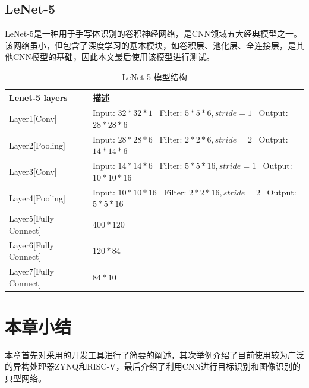     \subsection{LeNet-5}
    LeNet-5是一种用于手写体识别的卷积神经网络，是CNN领域五大经典模型之一。该网络虽小，但包含了深度学习的基本模块，如卷积层、池化层、全连接层，是其他CNN模型的基础，因此本文最后使用该模型进行测试。
    \begin{table}[h] %
        \centering
        \caption{LeNet-5 模型结构} %
        \begin{tabular}{l|l} %
        \hline  
        Lenet-5 layers & 描述 \\
        \hline %
        Layer1[Conv] & Input: $32*32*1$ \  Filter: $5*5*6, stride=1$ \  Output: $28*28*6$ \\
        \hline  
        Layer2[Pooling] & Input: $28*28*6$ \  Filter: $2*2*6, stride=2$ \  Output: $14*14*6$ \\
        \hline  
        Layer3[Conv] & Input: $14*14*6$ \  Filter: $5*5*16, stride=1$ \  Output: $10*10*16$ \\
        \hline  
        Layer4[Pooling] & Input: $10*10*16$ \  Filter: $2*2*16, stride=2$ \  Output: $5*5*16$ \\
        \hline  
        Layer5[Fully Connect] & $400*120$ \\
        \hline  
        Layer6[Fully Connect] & $120*84$ \\
        \hline  
        Layer7[Fully Connect] & $84*10$  \\
        \hline  
        \end{tabular}  
    \end{table}


\section{本章小结}
本章首先对采用的开发工具进行了简要的阐述，其次举例介绍了目前使用较为广泛的异构处理器ZYNQ和RISC-V，最后介绍了利用CNN进行目标识别和图像识别的典型网络。



